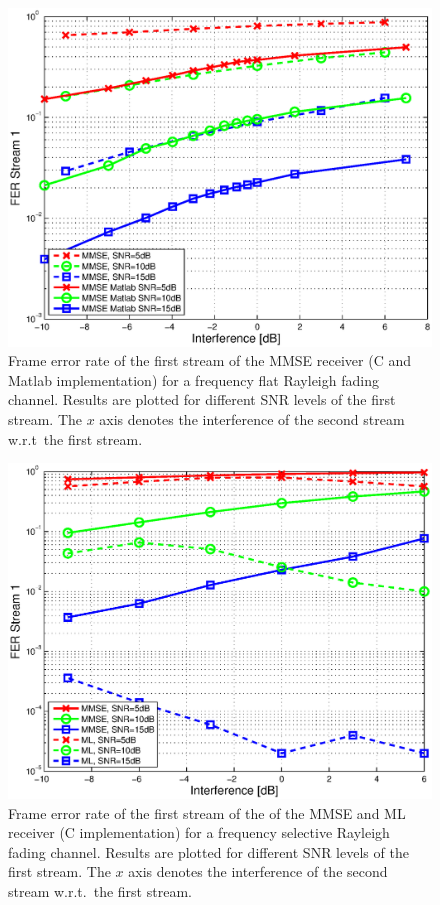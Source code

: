 \documentclass[a4paper,twocolumn,journal]{IEEEtran}
\begin{document}
\begin{figure}
 \includegraphics[width=\columnwidth]{figures/sim_results_MMSE_C+matlab}
 \caption{Frame error rate of the first stream of the MMSE receiver (C and Matlab implementation) for a frequency flat Rayleigh fading channel. Results are plotted for different SNR levels of the first stream. The $x$ axis denotes the interference of the second stream w.r.t\ the first stream.}
\label{fig:sim_results_MMSE}
\end{figure}

\begin{figure}
 \includegraphics[width=\columnwidth]{figures/sim_results_ML+MMSE_C_freq_sel}
 \caption{Frame error rate of the first stream of the of the MMSE and ML receiver (C implementation) for a frequency selective Rayleigh fading channel. Results are plotted for different SNR levels of the first stream. The $x$ axis denotes the interference of the second stream w.r.t.\ the first stream.}
\label{fig:sim_results_MMSE+ML_freq_sel}
\end{figure}
\end{document}
